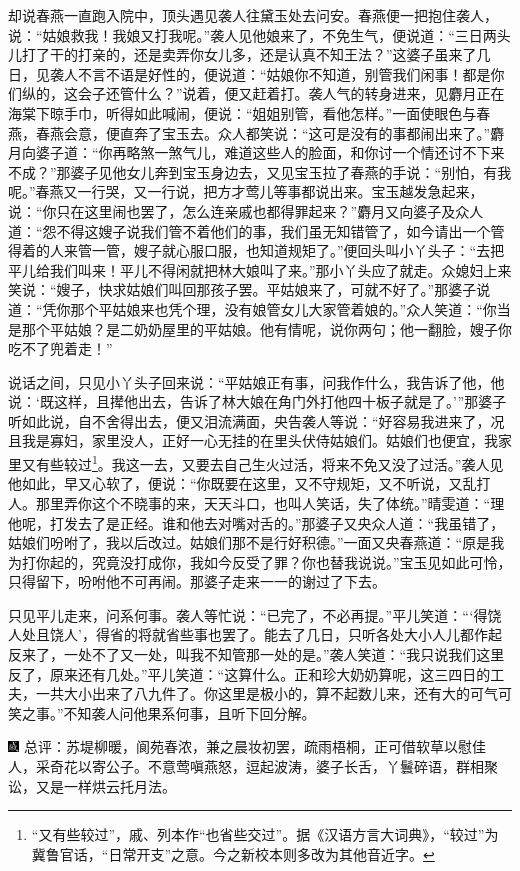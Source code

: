却说春燕一直跑入院中，顶头遇见袭人往黛玉处去问安。春燕便一把抱住袭人，说：“姑娘救我！我娘又打我呢。”袭人见他娘来了，不免生气，便说道：“三日两头儿打了干的打亲的，还是卖弄你女儿多，还是认真不知王法？”这婆子虽来了几日，见袭人不言不语是好性的，便说道：“姑娘你不知道，别管我们闲事！都是你们纵的，这会子还管什么？”说着，便又赶着打。袭人气的转身进来，见麝月正在海棠下晾手巾，听得如此喊闹，便说：“姐姐别管，看他怎样。”一面使眼色与春燕，春燕会意，便直奔了宝玉去。众人都笑说：“这可是没有的事都闹出来了。”麝月向婆子道：“你再略煞一煞气儿，难道这些人的脸面，和你讨一个情还讨不下来不成？”那婆子见他女儿奔到宝玉身边去，又见宝玉拉了春燕的手说：“别怕，有我呢。”春燕又一行哭，又一行说，把方才莺儿等事都说出来。宝玉越发急起来，说：“你只在这里闹也罢了，怎么连亲戚也都得罪起来？”麝月又向婆子及众人道：“怨不得这嫂子说我们管不着他们的事，我们虽无知错管了，如今请出一个管得着的人来管一管，嫂子就心服口服，也知道规矩了。”便回头叫小丫头子：“去把平儿给我们叫来！平儿不得闲就把林大娘叫了来。”那小丫头应了就走。众媳妇上来笑说：“嫂子，快求姑娘们叫回那孩子罢。平姑娘来了，可就不好了。”那婆子说道：“凭你那个平姑娘来也凭个理，没有娘管女儿大家管着娘的。”众人笑道：“你当是那个平姑娘？是二奶奶屋里的平姑娘。他有情呢，说你两句；他一翻脸，嫂子你吃不了兜着走！”

说话之间，只见小丫头子回来说：“平姑娘正有事，问我作什么，我告诉了他，他说：‘既这样，且撵他出去，告诉了林大娘在角门外打他四十板子就是了。’”那婆子听如此说，自不舍得出去，便又泪流满面，央告袭人等说：“好容易我进来了，况且我是寡妇，家里没人，正好一心无挂的在里头伏侍姑娘们。姑娘们也便宜，我家里又有些较过\footnote{“又有些较过”，戚、列本作“也省些交过”。据《汉语方言大词典》，“较过”为冀鲁官话，“日常开支”之意。今之新校本则多改为其他音近字。}。我这一去，又要去自己生火过活，将来不免又没了过活。”袭人见他如此，早又心软了，便说：“你既要在这里，又不守规矩，又不听说，又乱打人。那里弄你这个不晓事的来，天天斗口，也叫人笑话，失了体统。”晴雯道：“理他呢，打发去了是正经。谁和他去对嘴对舌的。”那婆子又央众人道：“我虽错了，姑娘们吩咐了，我以后改过。姑娘们那不是行好积德。”一面又央春燕道：“原是我为打你起的，究竟没打成你，我如今反受了罪？你也替我说说。”宝玉见如此可怜，只得留下，吩咐他不可再闹。那婆子走来一一的谢过了下去。

只见平儿走来，问系何事。袭人等忙说：“已完了，不必再提。”平儿笑道：“‘得饶人处且饶人’，得省的将就省些事也罢了。能去了几日，只听各处大小人儿都作起反来了，一处不了又一处，叫我不知管那一处的是。”袭人笑道：“我只说我们这里反了，原来还有几处。”平儿笑道：“这算什么。正和珍大奶奶算呢，这三四日的工夫，一共大小出来了八九件了。你这里是极小的，算不起数儿来，还有大的可气可笑之事。”不知袭人问他果系何事，且听下回分解。

{\includegraphics[width=3mm]{../Images/00005}  \kaishu 总评：苏堤柳暖，阆苑春浓，兼之晨妆初罢，疏雨梧桐，正可借软草以慰佳人，采奇花以寄公子。不意莺嗔燕怒，逗起波涛，婆子长舌，丫鬟碎语，群相聚讼，又是一样烘云托月法。}